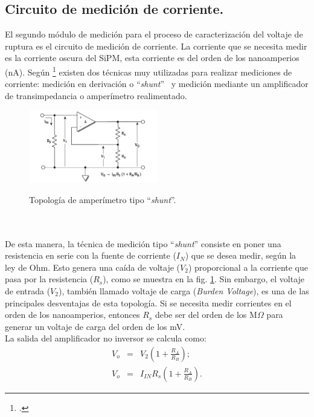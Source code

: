 \subsection{Circuito de medición de corriente.}
El segundo módulo de medición para el proceso de caracterización del voltaje de ruptura es el circuito de medición de corriente. La corriente que se necesita medir es la corriente oscura del  SiPM, esta corriente es del orden de los nanoamperios (nA). Según \footcite{low_level} existen dos técnicas muy utilizadas para realizar mediciones de corriente: medición en derivación o ``\textit{shunt}'' ~y medición mediante un amplificador de transimpedancia o amperímetro realimentado.
\begin{figure}[h!]
\begin{centering}
    \caption{Topología de amperímetro tipo ``\textit{shunt}''. }
    \includegraphics[width=0.5\textwidth]{Images/Shunt.png}
    \label{fig:shunt_circuit}
  \par\end{centering}
\end{figure}
\\ \\
De esta manera, la técnica de medición tipo ``\textit{shunt}'' consiste en poner una resistencia en serie con la fuente de corriente ($I_N$) que se desea medir, según la ley de Ohm. Esto genera una caída de voltaje ($V_2$) proporcional a la corriente que pasa por la resistencia ($R_s$), como se muestra en la fig. \ref{fig:shunt_circuit}. Sin embargo, el voltaje de entrada ($V_2$), también llamado voltaje de carga (\textit{Burden Voltage}), es una de las principales desventajas de esta topología. Si se necesita medir corrientes en el orden de los nanoamperios, entonces $R_s$ debe ser del orden de los M$\Omega$ para generar un voltaje de carga del orden de los mV.\\
La salida del amplificador no inversor se calcula como: 
\begin{eqnarray}
    V_o &=& V_2\left(1+\frac{R_A}{R_B}\right);\\
     V_o &=& I_{IN}R_s\left(1+\frac{R_A}{R_B}\right).
\end{eqnarray}
